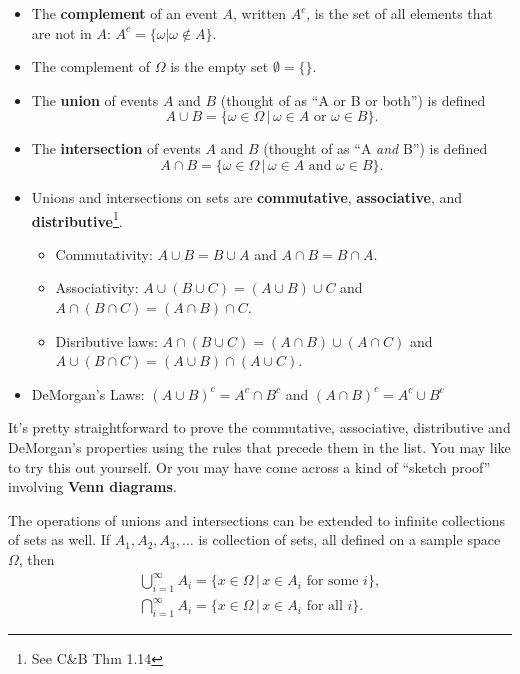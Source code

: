 \documentclass[
]{book}
\theoremstyle{definition}
\theoremstyle{definition}
\theoremstyle{definition}
\theoremstyle{definition}
\theoremstyle{remark}
\begin{document}
\begin{itemize}
\item
  The \textbf{complement} of an event \(A\), written \(A^c\), is the set of all elements that are not in \(A\): \(A^c = \{\omega | \omega\not\in A \}\).
\item
  The complement of \(\Omega\) is the empty set \(\emptyset = \{\}\).
\item
  The \textbf{union} of events \(A\) and \(B\) (thought of as ``A or B or both'') is defined
  \[
  A \cup B = \{\omega \in \Omega \,|\, \omega \in A \text{ or } \omega \in B \}.
  \]
\item
  The \textbf{intersection} of events \(A\) and \(B\) (thought of as ``A \emph{and} B'') is defined
  \[
  A \cap B = \{\omega \in \Omega \,|\, \omega \in A \text{ and } \omega \in B \}.
  \]
\item
  Unions and intersections on sets are \textbf{commutative}, \textbf{associative}, and \textbf{distributive}\footnote{See C\&B Thm 1.14}.

  \begin{itemize}
  \item
    Commutativity: \(A \cup B = B \cup A\) and \(A \cap B = B \cap A\).
  \item
    Associativity: \(A \cup (B \cup C) = (A \cup B) \cup C\) and \(A \cap (B \cap C) = (A \cap B) \cap C\).
  \item
    Disributive laws: \(A \cap (B \cup C) = (A \cap B) \cup (A \cap C)\) and \(A \cup (B \cap C) = (A \cup B) \cap (A \cup C)\).
  \end{itemize}
\item
  DeMorgan's Laws: \((A \cup B)^c = A^c \cap B^c\) and \((A \cap B)^c = A^c \cup B^c\)
\end{itemize}

It's pretty straightforward to prove the commutative, associative, distributive and DeMorgan's properties using the rules that precede them in the list. You may like to try this out yourself. Or you may have come across a kind of ``sketch proof'' involving \textbf{Venn diagrams}.

The operations of unions and intersections can be extended to infinite collections of sets as well.
If \(A_1,A_2,A_3,\dots\) is collection of sets, all defined on a sample space \(\Omega\), then
\begin{gather*}
\bigcup_{i=1}^\infty A_i = \{x \in \Omega \,|\, x\in A_i \text{ for some } i \}, \\
\bigcap_{i=1}^\infty A_i = \{x \in \Omega \,|\, x\in A_i \text{ for all } i \}.
\end{gather*}
\end{document}

